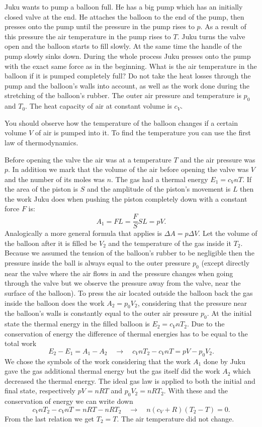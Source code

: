 {\ifEngStatement
Juku wants to pump a balloon full. He has a big pump which has an initially closed valve at the end. He attaches the balloon to the end of the pump, then presses onto the pump until the pressure in the pump rises to $p$. As a result of this pressure the air temperature in the pump rises to $T$. Juku turns the valve open and the balloon starts to fill slowly. At the same time the handle of the pump slowly sinks down. During the whole process Juku presses onto the pump with the exact same force as in the beginning. What is the air temperature in the balloon if it is pumped completely full? Do not take the heat losses through the pump and the balloon’s walls into account, as well as the work done during the stretching of the balloon’s rubber. The outer air pressure and temperature is $p_0$ and $T_0$. The heat capacity of air at constant volume is $c_V$.
\fi


\ifEngHint
You should observe how the temperature of the balloon changes if a certain volume $V$ of air is pumped into it. To find the temperature you can use the first law of thermodynamics.
\fi


\ifEngSolution
Before opening the valve the air was at a temperature $T$ and the air pressure was $p$. In addition we mark that the volume of the air before opening the valve was $V$ and the number of its moles was $n$. The gas had a thermal energy $E_1=c_VnT$. If the area of the piston is $S$ and the amplitude of the piston’s movement is $L$ then the work Juku does when pushing the piston completely down with a constant force $F$ is:
$$A_1=FL=\frac{F}{S}SL=pV.$$ 
Analogically a more general formula that applies is $\Delta A = p \Delta V$. Let the volume of the balloon after it is filled be $V_2$ and the temperature of the gas inside it $T_2$. Because we assumed the tension of the balloon’s rubber to be negligible then the pressure inside the ball is always equal to the outer pressure $p_0$ (except directly near the valve where the air flows in and the pressure changes when going through the valve but we observe the pressure away from the valve, near the surface of the balloon). To press the air located outside the balloon back the gas inside the balloon does the work $A_2=p_0V_2$, considering that the pressure near the balloon’s walls is constantly equal to the outer air pressure $p_0$. At the initial state the thermal energy in the filled balloon is $E_2=c_VnT_2$. Due to the conservation of energy the difference of thermal energies has to be equal to the total work
$$E_2-E_1 = A_1-A_2 \quad\rightarrow\quad c_VnT_2-c_VnT = pV - p_0V_2.$$ 
We chose the symbols of the work considering that the work $A_1$ done by Juku gave the gas additional thermal energy but the gas itself did the work $A_2$ which decreased the thermal energy. The ideal gas law is applied to both the initial and final state, respectively $pV=nRT$ and $p_0V_2=nRT_2$. With these and the conservation of energy we can write down
$$c_VnT_2-c_VnT = nRT-nRT_2 \quad\rightarrow\quad n(c_V+R)(T_2-T)=0.$$ 
From the last relation we get $T_2=T$. The air temperature did not change.
\fi
}